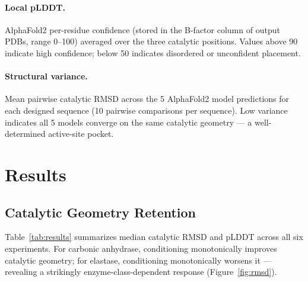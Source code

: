 \documentclass[11pt,letterpaper]{article}
\begin{document}
\paragraph{Local pLDDT.} AlphaFold2 per-residue confidence (stored in the B-factor column of output PDBs, range 0--100) averaged over the three catalytic positions. Values above 90 indicate high confidence; below 50 indicates disordered or unconfident placement.

\paragraph{Structural variance.} Mean pairwise catalytic RMSD across the 5 AlphaFold2 model predictions for each designed sequence (10 pairwise comparisons per sequence). Low variance indicates all 5 models converge on the same catalytic geometry — a well-determined active-site pocket.

\section{Results}

\subsection{Catalytic Geometry Retention}

Table~\ref{tab:results} summarizes median catalytic RMSD and pLDDT across all six experiments. For carbonic anhydrase, conditioning monotonically improves catalytic geometry; for elastase, conditioning monotonically worsens it — revealing a strikingly enzyme-class-dependent response (Figure~\ref{fig:rmsd}).
\end{document}
